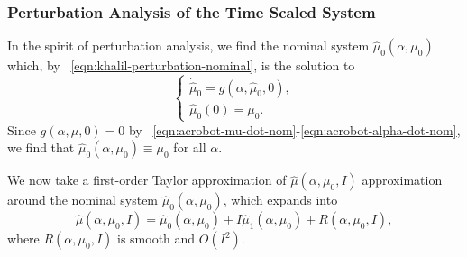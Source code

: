 \subsubsection*{Perturbation Analysis of the Time Scaled System}

In the spirit of perturbation analysis, we find the nominal system 
\(\hat{\mu}_0(\alpha,\mu_0)\) which,
by ~\eqref{eqn:khalil-perturbation-nominal}, is the solution to 
\[
\begin{cases}
    \dot{\hat{\mu}}_0 = g(\alpha,\hat{\mu}_0,0)
    , \\
    \hat{\mu}_0(0) = \mu_0
   .
\end{cases}
\]
Since \(g(\alpha,\mu,0) = 0\) by 
~\eqref{eqn:acrobot-mu-dot-nom}-\eqref{eqn:acrobot-alpha-dot-nom}, we find that
\(\hat{\mu}_0(\alpha,\mu_0) \equiv \mu_0\) for all \(\alpha\).

We now take a first-order Taylor approximation of \(\hat{\mu}(\alpha,\mu_0,I)\)
approximation around the nominal system \(\hat{\mu}_0(\alpha,\mu_0)\), which 
expands into 
\begin{equation}\label{eqn:acrobot-muhat-approx}
    \hat{\mu}(\alpha,\mu_0,I) = \hat{\mu}_0(\alpha,\mu_0) + I
    \hat{\mu}_1(\alpha,\mu_0)
    + R(\alpha,\mu_0,I)
    ,
\end{equation}
where \(R(\alpha,\mu_0,I)\) is smooth and \(O(I^2)\).

